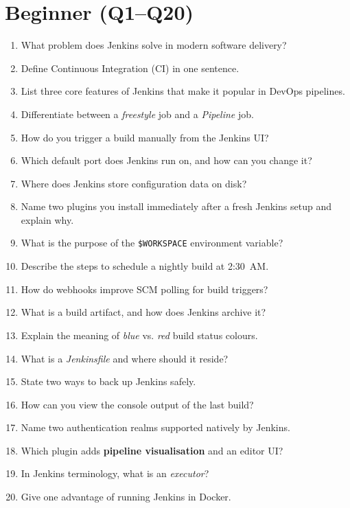 \documentclass[12pt]{article}
\begin{document}
\section*{Beginner (Q1--Q20)}
\begin{enumerate}[label=\textbf{\arabic*.}]
  \item What problem does Jenkins solve in modern software delivery?
  \item Define Continuous Integration (CI) in one sentence.
  \item List three core features of Jenkins that make it popular in DevOps pipelines.
  \item Differentiate between a \emph{freestyle} job and a \emph{Pipeline} job.
  \item How do you trigger a build manually from the Jenkins UI?
  \item Which default port does Jenkins run on, and how can you change it?
  \item Where does Jenkins store configuration data on disk?
  \item Name two plugins you install immediately after a fresh Jenkins setup and explain why.
  \item What is the purpose of the \texttt{\$WORKSPACE} environment variable?
  \item Describe the steps to schedule a nightly build at 2:30~AM.
  \item How do webhooks improve SCM polling for build triggers?
  \item What is a build artifact, and how does Jenkins archive it?
  \item Explain the meaning of \emph{blue} vs. \emph{red} build status colours.
  \item What is a \emph{Jenkinsfile} and where should it reside?
  \item State two ways to back up Jenkins safely.
  \item How can you view the console output of the last build?
  \item Name two authentication realms supported natively by Jenkins.
  \item Which plugin adds \textbf{pipeline visualisation} and an editor UI?
  \item In Jenkins terminology, what is an \emph{executor}?
  \item Give one advantage of running Jenkins in Docker.
\end{enumerate}
\end{document}
